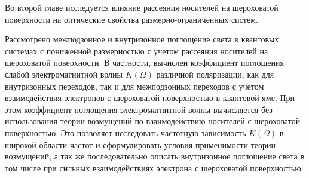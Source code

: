 Во второй главе исследуется влияние рассеяния носителей на шероховатой поверхности на оптические свойства размерно-ограниченных систем.

Рассмотрено межподзонное и внутризонное поглощение света в квантовых системах с пониженной размерностью с учетом рассеяния носителей на шероховатой поверхности. В частности, вычислен  коэффициент поглощения слабой электромагнитной волны $K\left(\Omega \right)$ различной поляризации, как для внутризонных переходов, так и для межподзонных переходов с учетом взаимодействия электронов с шероховатой поверхностью в квантовой яме. При этом коэффициент поглощения электромагнитной волны вычисляется без использования теории возмущений по взаимодействию носителей с шероховатой поверхностью. Это позволяет исследовать частотную зависимость $K(\Omega)$ в широкой области частот и сформулировать условия применимости теории возмущений, а так же последовательно описать внутризонное поглощение света в том числе при сильных взаимодействиях электрона с шероховатой поверхностью.	

